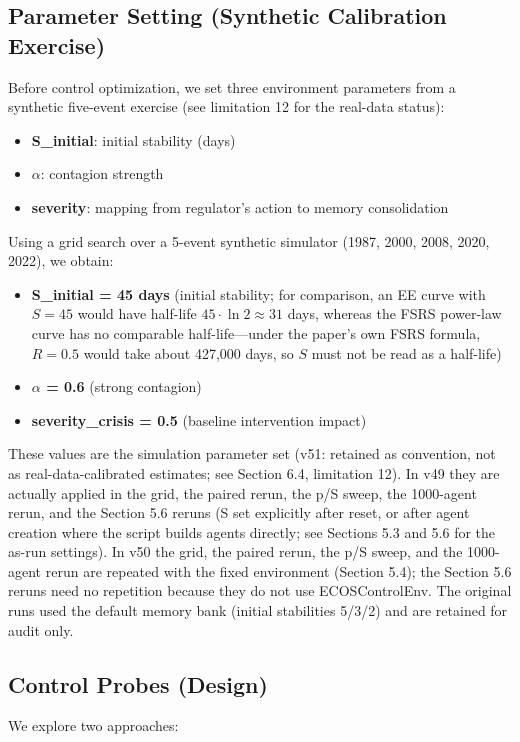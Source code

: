 \documentclass[11pt]{article}
\begin{document}
\subsection{Parameter Setting (Synthetic Calibration Exercise)}
Before control optimization, we set three environment parameters from a synthetic five-event exercise (see limitation 12 for the real-data status):

\begin{itemize}
\item \textbf{S\_initial}: initial stability (days)
\item \textbf{$\alpha$}: contagion strength
\item \textbf{severity}: mapping from regulator's action to memory consolidation
\end{itemize}

Using a grid search over a 5-event synthetic simulator (1987, 2000, 2008, 2020, 2022), we obtain:

\begin{itemize}
\item \textbf{S\_initial = 45 days} (initial stability; for comparison, an EE curve with $S=45$ would have half-life $45 \cdot \ln 2 \approx 31$ days, whereas the FSRS power-law curve has no comparable half-life---under the paper's own FSRS formula, $R=0.5$ would take about 427,000 days, so $S$ must not be read as a half-life)
\item \textbf{$\alpha$ = 0.6} (strong contagion)
\item \textbf{severity\_crisis = 0.5} (baseline intervention impact)
\end{itemize}

These values are the simulation parameter set (v51: retained as convention, not as real-data-calibrated estimates; see Section 6.4, limitation 12). In v49 they are actually applied in the grid, the paired rerun, the p/S sweep, the 1000-agent rerun, and the Section 5.6 reruns (S set explicitly after reset, or after agent creation where the script builds agents directly; see Sections 5.3 and 5.6 for the as-run settings). In v50 the grid, the paired rerun, the p/S sweep, and the 1000-agent rerun are repeated with the fixed environment (Section 5.4); the Section 5.6 reruns need no repetition because they do not use ECOSControlEnv. The original runs used the default memory bank (initial stabilities 5/3/2) and are retained for audit only.

\subsection{Control Probes (Design)}
We explore two approaches:
\end{document}
